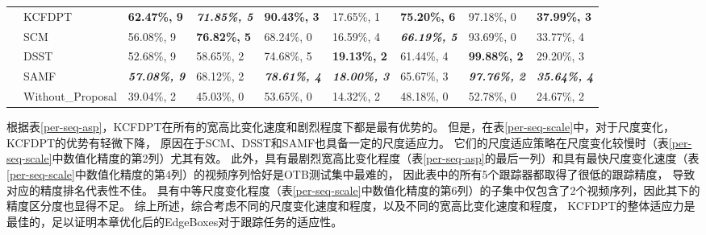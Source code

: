 \begin{table}[htb]
{\begin{tabular}{c l|l|l|l|l|l|l|l|}
			\multicolumn{1}{|l}{\multirow{5}{*}{\rotatebox{90}{\tabincell{c}{\textbf{重叠}\textbf{精度}}}}} &\multicolumn{1}{|l|}{KCFDPT}            & \textbf{62.47\%, 9}  & \textbf{\textit{71.85\%, 5}} & \textbf{90.43\%, 3} & 17.65\%, 1                        & \textbf{75.20\%, 6} & 97.18\%, 0                         & \textbf{37.99\%, 3} \\ \cline{2-9}
			\multicolumn{1}{|l}{}&\multicolumn{1}{|l|}{SCM}               & 56.08\%, 9                         & \textbf{76.82\%, 5} & 68.24\%, 0                        & 16.59\%, 4                        & \textbf{\textit{66.19\%, 5}} & 93.69\%, 0                         & 33.77\%, 4                        \\ \cline{2-9}
			\multicolumn{1}{|l}{}&\multicolumn{1}{|l|}{DSST}              & 52.68\%, 9                         & 58.65\%, 2                        & 74.68\%, 5                        & \textbf{19.13\%, 2} & 61.44\%, 4                        & \textbf{99.88\%, 2}  & 29.20\%, 3                        \\ \cline{2-9}
			\multicolumn{1}{|l}{}&\multicolumn{1}{|l|}{SAMF}              & \textbf{\textit{57.08\%, 9}}  & 68.12\%, 2                        & \textbf{\textit{78.61\%, 4}} & \textbf{\textit{18.00\%, 3}} & 65.67\%, 3                        & \textbf{\textit{97.76\%, 2}}  & \textbf{\textit{35.64\%, 4}} \\ \cline{2-9}
			\multicolumn{1}{|l}{}&\multicolumn{1}{|l|}{Without\_Proposal} & 39.04\%, 2                         & 45.03\%, 0                        & 53.65\%, 0                        & 14.32\%, 2                        & 48.18\%, 0                        & 52.78\%, 0                         & 24.67\%, 2                        \\ \hline
		\end{tabular}
	}
\end{table}

根据表\ref{per-seq-asp}，KCFDPT在所有的宽高比变化速度和剧烈程度下都是最有优势的。
但是，在表\ref{per-seq-scale}中，对于尺度变化，KCFDPT的优势有轻微下降，
原因在于SCM、DSST和SAMF也具备一定的尺度适应力。
它们的尺度适应策略在尺度变化较慢时（表\ref{per-seq-scale}中数值化精度的第2列）尤其有效。
此外，具有最剧烈宽高比变化程度（表\ref{per-seq-asp}的最后一列）和具有最快尺度变化速度（表\ref{per-seq-scale}中数值化精度的第4列）的视频序列恰好是OTB测试集中最难的，
因此表中的所有5个跟踪器都取得了很低的跟踪精度，
导致对应的精度排名代表性不佳。
具有中等尺度变化程度（表\ref{per-seq-scale}中数值化精度的第6列）的子集中仅包含了2个视频序列，因此其下的精度区分度也显得不足。
综上所述，综合考虑不同的尺度变化速度和程度，以及不同的宽高比变化速度和程度，
KCFDPT的整体适应力是最佳的，足以证明本章优化后的EdgeBoxes对于跟踪任务的适应性。

